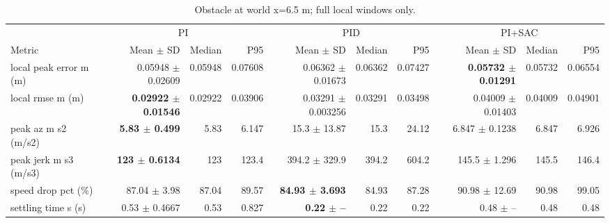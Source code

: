 \begin{table}[t]
\centering
\scriptsize
\caption{Obstacle at world x=6.5 m; full local windows only.}
\label{tab:obstacle-10}
\begin{tabular}{p{}*{9}{r}}
\toprule
 & \multicolumn{3}{c}{PI} & \multicolumn{3}{c}{PID} & \multicolumn{3}{c}{PI+SAC} \\
\cmidrule(lr){2-4}\cmidrule(lr){5-7}\cmidrule(lr){8-10}
Metric & Mean $\pm$ SD & Median & P95 & Mean $\pm$ SD & Median & P95 & Mean $\pm$ SD & Median & P95 \\
\midrule
local peak error m (m) & 0.05948 $\pm$ 0.02609 & 0.05948 & 0.07608 & 0.06362 $\pm$ 0.01673 & 0.06362 & 0.07427 & \textbf{0.05732 $\pm$ 0.01291} & 0.05732 & 0.06554 \\
local rmse m (m) & \textbf{0.02922 $\pm$ 0.01546} & 0.02922 & 0.03906 & 0.03291 $\pm$ 0.003256 & 0.03291 & 0.03498 & 0.04009 $\pm$ 0.01403 & 0.04009 & 0.04901 \\
peak az m s2 (m/s2) & \textbf{5.83 $\pm$ 0.499} & 5.83 & 6.147 & 15.3 $\pm$ 13.87 & 15.3 & 24.12 & 6.847 $\pm$ 0.1238 & 6.847 & 6.926 \\
peak jerk m s3 (m/s3) & \textbf{123 $\pm$ 0.6134} & 123 & 123.4 & 394.2 $\pm$ 329.9 & 394.2 & 604.2 & 145.5 $\pm$ 1.296 & 145.5 & 146.4 \\
speed drop pct (\%) & 87.04 $\pm$ 3.98 & 87.04 & 89.57 & \textbf{84.93 $\pm$ 3.693} & 84.93 & 87.28 & 90.98 $\pm$ 12.69 & 90.98 & 99.05 \\
settling time s (s) & 0.53 $\pm$ 0.4667 & 0.53 & 0.827 & \textbf{0.22 $\pm$ --} & 0.22 & 0.22 & 0.48 $\pm$ -- & 0.48 & 0.48 \\
\bottomrule
\end{tabular}
\end{table}
